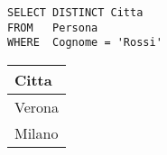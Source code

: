 \begin{lstlisting}
SELECT DISTINCT Citta
FROM   Persona
WHERE  Cognome = 'Rossi'
\end{lstlisting}

\begin{center}
	\begin{tabular}{@{} l @{}}
		\toprule
			Citta \\
		\midrule
			Verona \\
			Milano \\
		\bottomrule
	\end{tabular}
\end{center}
